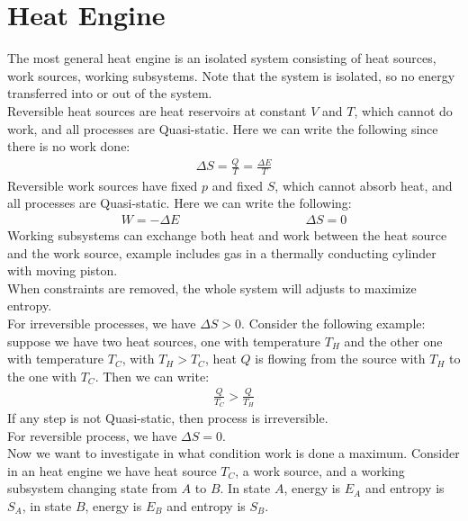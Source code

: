 \documentclass[11pt,oneside]{book}
\theoremstyle{break}
\theoremstyle{break}
\begin{document}
\newpage
\section[Heat Engine]{\color{red}Heat Engine\color{black}}
The most general heat engine is an isolated system consisting of heat sources, work sources, working subsystems. Note that the system is isolated, so no energy transferred into or out of the system. \\

Reversible heat sources are heat reservoirs at constant $V$ and $T$, which cannot do work, and all processes are Quasi-static. Here we can write the following since there is no work done:
\begin{align*}
\Delta S = \frac{Q}{T} = \frac{\Delta E}{T}
\end{align*}
Reversible work sources have fixed $p$ and fixed $S$, which cannot absorb heat, and all processes are Quasi-static. Here we can write the following:
\begin{align*}
W = -\Delta E \qquad\qquad\qquad\qquad\qquad \Delta S= 0
\end{align*}
Working subsystems can exchange both heat and work between the heat source and the work source, example includes gas in a thermally conducting cylinder with moving piston. \\

When constraints are removed, the whole system will adjusts to maximize entropy. \\

For irreversible processes, we have $\Delta S >0$. Consider the following example: suppose we have two heat sources, one with temperature $T_H$ and the other one with temperature $T_C$, with $T_H>T_C$, heat $Q$ is flowing from the source with $T_H$ to the one with $T_C$. Then we can write:
\begin{align*}
\frac{Q}{T_C} > \frac{Q}{T_H}
\end{align*}
If any step is not Quasi-static, then process is irreversible. \\

For reversible process, we have $\Delta S = 0$.\\

Now we want to investigate in what condition work is done a maximum. Consider in an heat engine we have heat source $T_C$, a work source, and a working subsystem changing state from $A$ to $B$. In state $A$, energy is $E_A$ and entropy is $S_A$, in state $B$, energy is $E_B$ and entropy is $S_B$.\\ 
\end{document}
